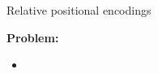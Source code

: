 
\begin{vbframe}{Relative positional encodings}

\vfill

\textbf{Problem:}

\begin{itemize}
	\item 
\end{itemize}

\vfill

\end{vbframe}


\endlecture


